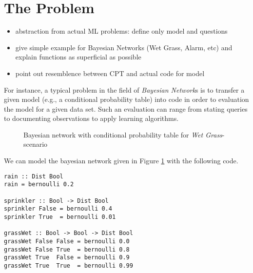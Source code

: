 \documentclass[
12pt, %
a4paper, %
oneside, %
]{llncs}
\begin{document}
\section{The Problem}

\begin{itemize}
\item abstraction from actual ML problems: define only model and
  questions
\item give simple example for Bayesian Networks (Wet Grass, Alarm,
  etc) and explain functions as superficial as possible
\item point out resemblence between CPT and actual code for model
\end{itemize}


For instance, a typical problem in the field of \emph{Bayesian
  Network}s is to transfer a given model (e.g., a conditional
probability table) into code in order to evaluation the model for a
given data set. %
Such an evaluation can range from stating queries to documenting
observations to apply learning algorithms. %

\begin{figure}
\label{fig:WetGrass}
\caption{Bayesian network with conditional probability table for
  \emph{Wet Grass}-scenario}
\end{figure}

We can model the bayesian network given in Figure \ref{fig:WetGrass} with the following code. %

\begin{verbatim}
rain :: Dist Bool
rain = bernoulli 0.2

sprinkler :: Bool -> Dist Bool
sprinkler False = bernoulli 0.4
sprinkler True  = bernoulli 0.01

grassWet :: Bool -> Bool -> Dist Bool
grassWet False False = bernoulli 0.0
grassWet False True  = bernoulli 0.8
grassWet True  False = bernoulli 0.9
grassWet True  True  = bernoulli 0.99
\end{verbatim}
\end{document}
